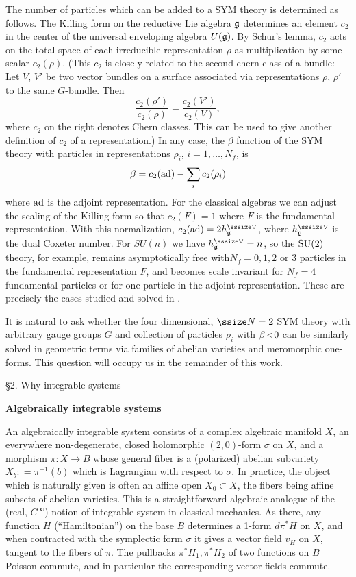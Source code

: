 The number of particles which can be added to a SYM theory
is determined as follows.
The Killing form on the reductive Lie algebra $\frak{g}$
determines an element $c_2$ in the center of the universal
enveloping algebra $U(\frak{g})$.
By Schur's lemma, $c_2$ acts on the total space of each
irreducible representation $\rho$ as multiplication by
some scalar $c_2(\rho)$.
(This $c_2$ is closely related to the second chern class 
of a bundle: 
 Let $V$, $V'$ be two
vector bundles on a surface associated via representations
$\rho$, $\rho'$ to the same $G$-bundle.
Then
$$
\frac{c_2(\rho')}{c_2(\rho)}=\frac{c_2(V')}{c_2(V)},
$$
where $c_2$ on the right denotes Chern classes. This can 
be used to give another definition of $c_2$ of a representation.)
In any case, the $\beta$ function of the SYM theory with
particles in representations $\rho_i$, $i=1,\dotsc,N_f$, is
$$
\beta=c_2(\text{\rm ad})-\sum_i c_2(\rho_i)
$$
where $\text{\rm ad}$ is the
adjoint representation.
For the classical algebras we can adjust the scaling of the
Killing form so that $c_2(F)=1$ where $F$ is the fundamental
representation.
With this normalization, $c_2(\ad)=2h_\bfg^{\upvee}$, where
$h_\bfg^{\upvee}$ is the dual Coxeter number.
For $SU(n)$ we have $h_\bfg^{\upvee}=n$, so the $\text{\rm SU}(2)$
theory, for example, remains asymptotically free
with$N_f=0,1,2$ or $3$ particles in the fundamental
representation $F$, and becomes scale invariant for $N_f=4$
fundamental particles or for one particle in the adjoint
representation.
These are precisely the cases studied and solved in
\cite{SW2}.

It is natural to ask whether the four dimensional, $\ssize N=2$ SYM
theory with arbitrary gauge groups $G$ and collection of
particles $\rho_i$ with
$\beta\Le 0$ can be similarly solved in
geometric terms via families of abelian varieties and
meromorphic one-forms.
This question will occupy us in the remainder of this work.


\head \S2.  Why integrable systems
\endhead

\medskip\noindent
{\bf Algebraically integrable systems}

An algebraically integrable system consists of a complex 
algebraic manifold $X$, an everywhere non-degenerate, closed
holomorphic $(2,0)$-form $\sigma$ on $X$, and a morphism 
$\pi : X\to B$ whose
general fiber is a (polarized) abelian subvariety 
$X_b: = \pi^{-1} (b)$ which is
Lagrangian with respect to $\sigma$.  In practice, the object 
which is naturally
given is often an affine open $X_0\subset X$, the fibers being 
affine subsets of
abelian varieties.  This is a straightforward algebraic analogue 
of the (real,
$C^\infty$) notion of integrable system in classical mechanics.  
As there, any
function $H$ (``Hamiltonian'') on the base $B$ determines a 1-form 
$d\pi^*H$ on
$X$, and when contracted with the symplectic form $\sigma$ it gives 
a vector
field $v_H$ on $X$, tangent to the fibers of $\pi$.  The pullbacks 
$\pi^*H_1,
\pi^*H_2$ of two functions on $B$ Poisson-commute, and in particular 
the
corresponding vector fields commute.

